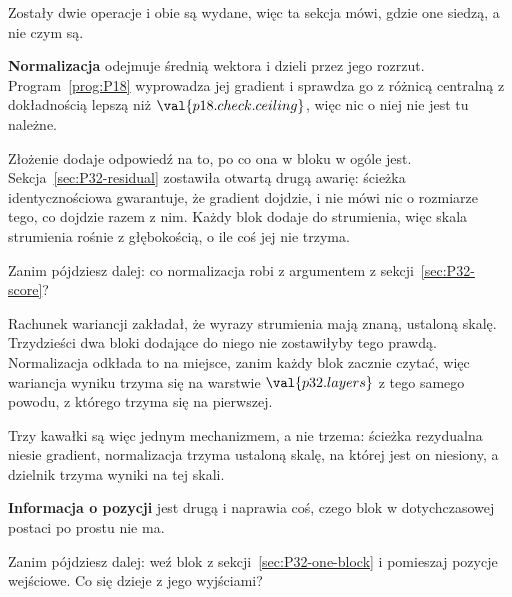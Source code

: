 \begin{fr}
Zostały dwie operacje i obie są wydane, więc ta sekcja mówi, gdzie one siedzą,
a nie czym są.

\textbf{Normalizacja} odejmuje średnią wektora i dzieli przez jego rozrzut.
Program~\ref{prog:P18} wyprowadza jej gradient i sprawdza go z różnicą
centralną z dokładnością lepszą niż $\val{p18.check.ceiling}$, więc nic o niej
nie jest tu należne.

Złożenie dodaje odpowiedź na to, po co ona w bloku w ogóle jest.
Sekcja~\ref{sec:P32-residual} zostawiła otwartą drugą awarię: ścieżka
identycznościowa gwarantuje, że gradient dojdzie, i nie mówi nic o rozmiarze
tego, co dojdzie razem z nim. Każdy blok dodaje do strumienia, więc skala
strumienia rośnie z głębokością, o ile coś jej nie trzyma.

Zanim pójdziesz dalej: co normalizacja robi z argumentem z
sekcji~\ref{sec:P32-score}?
\dotline
\nextframe
\end{fr}

\begin{fr}

Rachunek wariancji zakładał, że wyrazy strumienia mają znaną, ustaloną skalę.
Trzydzieści dwa bloki dodające do niego nie zostawiłyby tego prawdą.
Normalizacja odkłada to na miejsce, zanim każdy blok zacznie czytać, więc
wariancja wyniku trzyma się na warstwie $\val{p32.layers}$ z tego samego
powodu, z którego trzyma się na pierwszej.

Trzy kawałki są więc jednym mechanizmem, a nie trzema: ścieżka rezydualna
niesie gradient, normalizacja trzyma ustaloną skalę, na której jest on
niesiony, a dzielnik trzyma wyniki na tej skali.

\textbf{Informacja o pozycji} jest drugą i naprawia coś, czego blok w
dotychczasowej postaci po prostu nie ma.

Zanim pójdziesz dalej: weź blok z sekcji~\ref{sec:P32-one-block} i pomieszaj
pozycje wejściowe. Co się dzieje z jego wyjściami?
\dotline
\nextframe
\end{fr}

